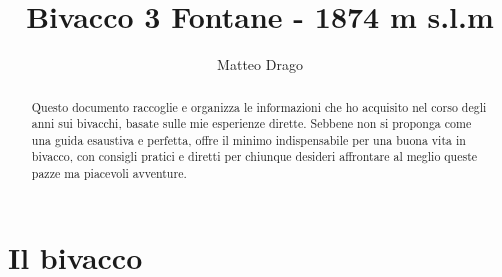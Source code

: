 \documentclass{article}
\title{\textbf{Bivacco 3 Fontane - 1874 m s.l.m}}
\author{Matteo Drago}
\begin{document}
\maketitle
\thispagestyle{fancy} %

\begin{abstract}
Questo documento raccoglie e organizza le informazioni che ho acquisito nel corso degli anni sui bivacchi, basate sulle mie esperienze dirette. Sebbene non si proponga come una guida esaustiva e perfetta, offre il minimo indispensabile per una buona vita in bivacco, con consigli pratici e diretti per chiunque desideri affrontare al meglio queste pazze ma piacevoli avventure.
\end{abstract}

\section{Il bivacco}
\end{document}
